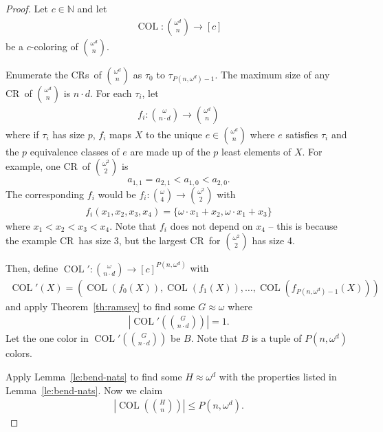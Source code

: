 \documentclass[11pt]{article}
\newcommand{\om}{\omega}
\newcommand{\oequiv}{\approx}
\newcommand{\COL}{\operatorname{COL}}
\newcommand{\N}{\mathbb{N}}
\newcommand{\crulenospace}{CR}
\newcommand{\crule}{\crulenospace~}
\newcommand{\crules}{\crulenospace s~}
\newcommand{\numpoints}{n}
\newcommand{\numcolors}{c}
\newcommand{\commonconst}{a}
\newcommand{\Rareconst}{B}
\theoremstyle{plain}
\theoremstyle{definition}
\begin{document}
\begin{proof}
Let $\numcolors \in \N$ and let \begin{align*}
    \COL \colon \binom{\om^d}{\numpoints} \to [\numcolors]
\end{align*}
be a $\numcolors$-coloring of $\binom{\om^d}{\numpoints}$. 

Enumerate the \crules of $\binom{\om^d}{\numpoints}$ as $\tau_0$ to $\tau_{P(\numpoints, \om^d)-1}$. The maximum size of any \crule of $\binom{\om^d}{\numpoints}$ is $\numpoints \cdot d$. For each $\tau_i$, let \begin{align*}
    f_i \colon \binom{\om}{\numpoints \cdot d} \to \binom{\om^d}{\numpoints}
\end{align*}
where if $\tau_i$ has size $p$, $f_i$ maps $X$ to the unique $e \in \binom{\om^d}{\numpoints}$ where $e$ satisfies $\tau_i$ and the $p$ equivalence classes of $e$ are made up of the $p$ least elements of $X$. For example, one \crule of $\binom{\om^2}{2}$ is $$
\commonconst_{1, 1} = \commonconst_{2, 1} < \commonconst_{1, 0} < \commonconst_{2, 0}.
$$ The corresponding $f_i$ would be $f_i \colon \binom{\om}{4} \to \binom{\om^2}{2}$ with \begin{align*}
f_i(x_1,x_2,x_3,x_4) = \{\om \cdot x_1 + x_2, \om \cdot x_1 + x_3\}
\end{align*} where $x_1 < x_2 < x_3 < x_4$. Note that $f_i$ does not depend on $x_4$ -- this is because the example \crule has size 3, but the largest \crule for $\binom{\om^2}{2}$ has size 4.

Then, define $\COL' \colon \binom{\om}{\numpoints \cdot d} \to [\numcolors]^{P(\numpoints,\om^d)}$ with \begin{align*}
    \COL'(X) = (\COL(f_0(X)),\COL(f_1(X)),\ldots,\COL(f_{P(\numpoints, \om^d)-1}(X)))
\end{align*}
and apply Theorem~\ref{th:ramsey} to find some $G \oequiv \om$ where
\begin{align*}
 \left |  \COL' \left( \binom{G}{\numpoints \cdot d} \right)\right | = 1.
\end{align*}
Let the one color in $\COL'\left(\binom{G}{\numpoints \cdot d}\right)$ be $\Rareconst$.
Note that $\Rareconst$ is a tuple of $P(\numpoints, \om^d)$ colors.

Apply Lemma~\ref{le:bend-nats} to find some $H \oequiv \om^d$ with the properties listed in Lemma~\ref{le:bend-nats}. Now we claim \begin{align*}
    \left | \COL \left( \binom{H}{\numpoints} \right)\right |\leq P(\numpoints, \om^d).
\end{align*}


\end{proof}
\end{document}
